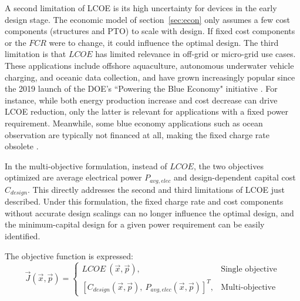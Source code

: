 A second limitation of LCOE is its high uncertainty for devices in the early design stage. The economic model of section~\ref{sec:econ} only assumes a few cost components (structures and PTO) to scale with design. If fixed cost components or the $FCR$ were to change, it could influence the optimal design. The third limitation is that $LCOE$ has limited relevance in off-grid or micro-grid use cases. These applications include offshore aquaculture, autonomous underwater vehicle charging, and oceanic data collection, and have grown increasingly popular since the 2019 launch of the DOE's ``Powering the Blue Economy" initiative \cite{livecchi_powering_2019}. For instance, while both energy production increase and cost decrease can drive LCOE reduction, only the latter is relevant for applications with a fixed power requirement. Meanwhile, some blue economy applications such as ocean observation are typically not financed at all, making the fixed charge rate obsolete \cite{jenne_powering_2021}. 

In the multi-objective formulation, instead of $LCOE$, the two objectives optimized are average electrical power $P_{avg,elec}$ and design-dependent capital cost $C_{design}$. This directly addresses the second and third limitations of LCOE just described. Under this formulation, the fixed charge rate and cost components without accurate design scalings can no longer influence the optimal design, and the minimum-capital design for a given power requirement can be easily identified.

The objective function is expressed:
\begin{equation}
\vec{J}(\vec{x}, \vec{p}) = \begin{cases} LCOE\ (\vec{x}, \vec{p}), & \text{Single objective} \\
[C_{design} (\vec{x}, \vec{p}),\ P_{avg,elec} (\vec{x}, \vec{p})]^T, & \text{Multi-objective}
\end{cases}
\label{obj}
\end{equation}

